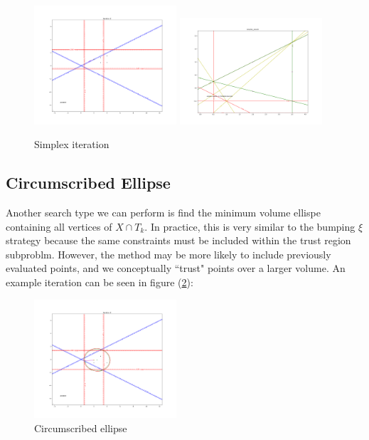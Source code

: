 \documentclass{article}
\theoremstyle{case}
\newcommand{\domain}{X}
\let\oldref\ref
\renewcommand{\ref}[1]{(\oldref{#1})}
\begin{document}
\begin{figure}[h]
    \centering
    \includegraphics[width=200px]{images/simplex_iteration.png}
    \includegraphics[width=200px]{images/simplex_search.png}
    \caption{Simplex iteration}
    \label{simplex_iterations}
\end{figure}

\subsection{Circumscribed Ellipse}

Another search type we can perform is find the minimum volume ellispe containing all vertices of $\domain \cap T_k$.
In practice, this is very similar to the bumping $\xi$ strategy because the same constraints must be included within the trust region subproblm.
However, the method may be more likely to include previously evaluated points, and we conceptually ``trust"  points over a larger volume.
An example iteration can be seen in figure \ref{circumscribed_ellipse}:


\begin{figure}[h]
    \centering
    \includegraphics[width=200px]{images/circumscribed_ellipse.png}
    \caption{Circumscribed ellipse}
    \label{circumscribed_ellipse}
\end{figure}
\end{document}
